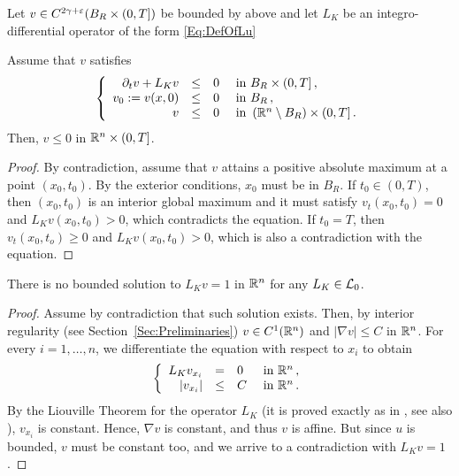 \begin{theorem}
\label{Th:ParabolicmaxPrpBdd}
Let  $v \in C^{2\gamma+\varepsilon}(B_R\times(0,T])$ be bounded by above and let $L_K$ be an integro-differential operator of the form \eqref{Eq:DefOfLu}

Assume that $v$ satisfies
\begin{equation*}
\left\{\begin{array}{rcll}
\partial_t v + L_K v &\leq& 0 & \textrm{ in }B_R\times(0,T]\,,\\
v_0:=v(x,0) &\leq& 0 & \textrm{ in } B_R\,,\\
v &\leq& 0 & \textrm{ in } \left( \mathbb{R}^n\setminus B_R\right) \times (0,T] \,.
\end{array} \right.
\end{equation*}
Then, $v\leq 0$ in $\mathbb{R}^n\times (0,T]$.
\end{theorem}

\begin{proof}
By contradiction, assume that $v$ attains a positive absolute maximum at a point $(x_0,t_0)$. By the exterior conditions, $x_0$ must be in $B_R$. If $t_0\in(0,T)$, then $(x_0,t_0)$ is an interior global maximum and it must satisfy $v_t(x_0,t_0)=0$ and $L_K v(x_0,t_0)>0$, which contradicts the equation. If $t_0 = T$, then $v_t(x_0,t_o)\geq 0$ and $L_K v(x_0,t_0)>0$, which is also a contradiction with the equation.
\end{proof}

\begin{lemma}
\label{Lemma:NoBddSolL=1}
There is no bounded solution to $L_K v=1$ in $\mathbb{R}^n$ for any $L_K \in \mathcal{L}_0$.
\end{lemma}

\begin{proof}
Assume by contradiction that such solution exists. Then, by interior regularity (see Section~\ref{Sec:Preliminaries}) $v\in C^1(\mathbb{R}^n)$ and $|\nabla v|\leq C$ in $\mathbb{R}^n$. For every $i = 1,\ldots, n$, we differentiate the equation with respect to $x_i$ to obtain
\begin{equation*}
\left\{\begin{array}{rcll}
L_K  v_{x_i} &=& 0 & \textrm{ in } \mathbb{R}^n\,,\\
|v_{x_i}| &\leq& C & \textrm{ in } \mathbb{R}^n\,.
\end{array} \right.
\end{equation*}
By the Liouville Theorem for the operator $L_K $ (it is proved exactly as in \cite{RosOtonSerra-Stable}, see also \cite{SerraC2s+alphaRegularity}), $v_{x_i}$ is constant. Hence, $\nabla v$ is constant, and thus $v$ is affine. But since $u$ is bounded, $v$ must be constant too, and we arrive to a contradiction with $L_K v=1$.
\end{proof}

